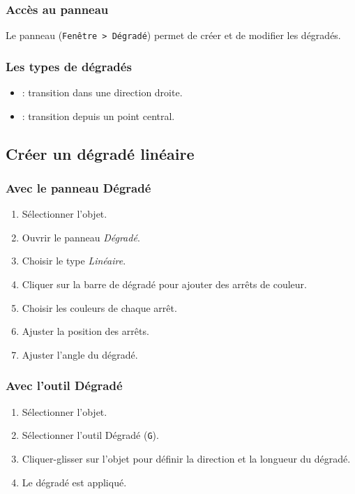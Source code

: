 \subsubsection{Accès au panneau}

Le panneau  (\texttt{Fenêtre > Dégradé}) permet de créer et de modifier les dégradés.

\subsubsection{Les types de dégradés}

\begin{itemize}
    \item {} : transition dans une direction droite.
    \item {} : transition depuis un point central.
\end{itemize}

\subsection{Créer un dégradé linéaire}

\subsubsection{Avec le panneau Dégradé}

\begin{enumerate}
    \item Sélectionner l'objet.
    \item Ouvrir le panneau \emph{Dégradé}.
    \item Choisir le type \emph{Linéaire}.
    \item Cliquer sur la barre de dégradé pour ajouter des arrêts de couleur.
    \item Choisir les couleurs de chaque arrêt.
    \item Ajuster la position des arrêts.
    \item Ajuster l'angle du dégradé.
\end{enumerate}

\subsubsection{Avec l'outil Dégradé}

\begin{enumerate}
    \item Sélectionner l'objet.
    \item Sélectionner l'outil Dégradé (\texttt{G}).
    \item Cliquer-glisser sur l'objet pour définir la direction et la longueur du dégradé.
    \item Le dégradé est appliqué.
\end{enumerate}


